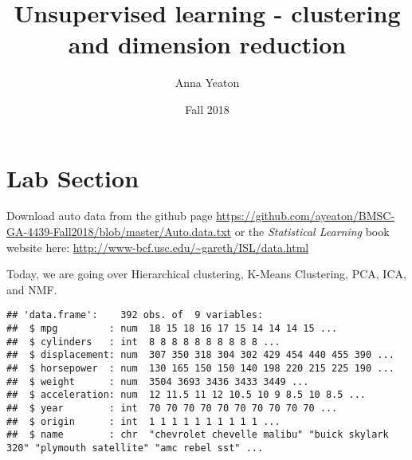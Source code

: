 \documentclass[11pt,]{article}
\title{Unsupervised learning - clustering and dimension reduction}
\author{Anna Yeaton}
\date{Fall 2018}
\newenvironment{Shaded}{\begin{snugshade}}{\end{snugshade}}
\newcommand{\CommentTok}[1]{\textcolor[rgb]{0.56,0.35,0.01}{\textit{#1}}}
\newcommand{\DataTypeTok}[1]{\textcolor[rgb]{0.13,0.29,0.53}{#1}}
\newcommand{\KeywordTok}[1]{\textcolor[rgb]{0.13,0.29,0.53}{\textbf{#1}}}
\newcommand{\NormalTok}[1]{#1}
\newcommand{\OperatorTok}[1]{\textcolor[rgb]{0.81,0.36,0.00}{\textbf{#1}}}
\newcommand{\StringTok}[1]{\textcolor[rgb]{0.31,0.60,0.02}{#1}}
\begin{document}
\maketitle

\hypertarget{lab-section}{%
\section{Lab Section}\label{lab-section}}

Download auto data from the github page
\url{https://github.com/ayeaton/BMSC-GA-4439-Fall2018/blob/master/Auto.data.txt}
or the \emph{Statistical Learning} book website here:
\url{http://www-bcf.usc.edu/~gareth/ISL/data.html}

Today, we are going over Hierarchical clustering, K-Means Clustering,
PCA, ICA, and NMF.

\begin{Shaded}
\end{Shaded}

\begin{verbatim}
## 'data.frame':    392 obs. of  9 variables:
##  $ mpg         : num  18 15 18 16 17 15 14 14 14 15 ...
##  $ cylinders   : int  8 8 8 8 8 8 8 8 8 8 ...
##  $ displacement: num  307 350 318 304 302 429 454 440 455 390 ...
##  $ horsepower  : num  130 165 150 150 140 198 220 215 225 190 ...
##  $ weight      : num  3504 3693 3436 3433 3449 ...
##  $ acceleration: num  12 11.5 11 12 10.5 10 9 8.5 10 8.5 ...
##  $ year        : int  70 70 70 70 70 70 70 70 70 70 ...
##  $ origin      : int  1 1 1 1 1 1 1 1 1 1 ...
##  $ name        : chr  "chevrolet chevelle malibu" "buick skylark 320" "plymouth satellite" "amc rebel sst" ...
\end{verbatim}
\end{document}
